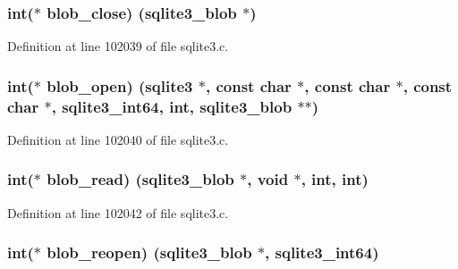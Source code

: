 \subsubsection[{blob\+\_\+close}]{\setlength{\rightskip}{0pt plus 5cm}int($\ast$ blob\+\_\+close) ({\bf sqlite3\+\_\+blob} $\ast$)}\label{structsqlite3__api__routines_aa34d89a77100af517c61cdb4b49ecec8}


Definition at line 102039 of file sqlite3.\+c.

\hypertarget{structsqlite3__api__routines_a393cdfc5f8d12f2f3f4da93c9fb91d4e}{}
\subsubsection[{blob\+\_\+open}]{\setlength{\rightskip}{0pt plus 5cm}int($\ast$ blob\+\_\+open) ({\bf sqlite3} $\ast$, const char $\ast$, const char $\ast$, const char $\ast$, {\bf sqlite3\+\_\+int64}, int, {\bf sqlite3\+\_\+blob} $\ast$$\ast$)}\label{structsqlite3__api__routines_a393cdfc5f8d12f2f3f4da93c9fb91d4e}


Definition at line 102040 of file sqlite3.\+c.

\hypertarget{structsqlite3__api__routines_a1bdd1257c6b9865418d523040b002cc8}{}
\subsubsection[{blob\+\_\+read}]{\setlength{\rightskip}{0pt plus 5cm}int($\ast$ blob\+\_\+read) ({\bf sqlite3\+\_\+blob} $\ast$, void $\ast$, int, int)}\label{structsqlite3__api__routines_a1bdd1257c6b9865418d523040b002cc8}


Definition at line 102042 of file sqlite3.\+c.

\hypertarget{structsqlite3__api__routines_af2b9e57cc5bbdc635490235dfc1dc57a}{}
\subsubsection[{blob\+\_\+reopen}]{\setlength{\rightskip}{0pt plus 5cm}int($\ast$ blob\+\_\+reopen) ({\bf sqlite3\+\_\+blob} $\ast$, {\bf sqlite3\+\_\+int64})}\label{structsqlite3__api__routines_af2b9e57cc5bbdc635490235dfc1dc57a}


